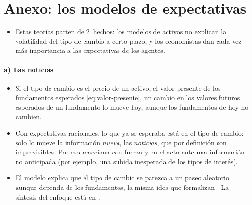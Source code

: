 \documentclass[11pt]{article}
\begin{document}
\section{Anexo: los modelos de expectativas}\label{anexo:expectativas}

\begin{itemize}
\item Estas teorías parten de 2~hechos: los modelos de activos no explican la volatilidad del tipo de cambio a corto plazo, y los economistas dan cada vez más importancia a las expectativas de los agentes.
\end{itemize}

\paragraph{a) Las noticias}
\begin{itemize}
\item Si el tipo de cambio es el precio de un activo, el valor presente de los fundamentos esperados \eqref{eq:valor-presente}, un cambio en los valores futuros esperados de un fundamento lo mueve hoy, aunque los fundamentos de hoy no cambien\nocite{Mussa1976Exchange,Mussa1982Model}.
\item Con expectativas racionales, lo que ya se esperaba está en el tipo de cambio: solo lo mueve la información \emph{nueva}, las \emph{noticias}, que por definición son imprevisibles\nocite{Frenkel1981News}. Por eso reacciona con fuerza y en el acto ante una información no anticipada (por ejemplo, una subida inesperada de los tipos de interés).
\item El modelo explica que el tipo de cambio se parezca a un paseo aleatorio aunque dependa de los fundamentos, la misma idea que formalizan \textcite{EngelWest2005}. La síntesis del enfoque está en \textcite{FrenkelMussa1985}.
\end{itemize}
\end{document}
